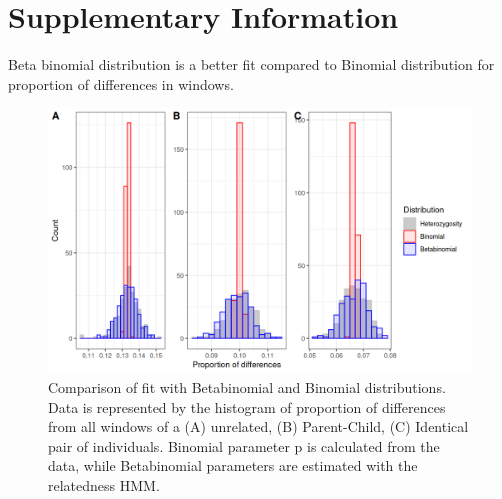 \documentclass[12pt, letterpaper]{article}
\begin{document}
\section{Supplementary Information}
Beta binomial distribution is a better fit compared to Binomial distribution for proportion of differences in windows.
\begin{figure}[h]
    \centering
    \includegraphics[width=18cm]{supplementary_info/plots/binom.png}
    \caption{Comparison of fit with Betabinomial and Binomial distributions. Data is represented by the histogram of proportion of differences from all windows of a (A) unrelated, (B) Parent-Child, (C) Identical pair of individuals. Binomial parameter p is calculated from the data, while Betabinomial parameters are estimated with the relatedness HMM.}
    \label{figS1}
\end{figure}
\end{document}
